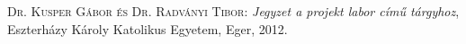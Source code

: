 \documentclass[
]{thesis-ekf}
\theoremstyle{definition}
\theoremstyle{remark}
\begin{document}
\begin{thebibliography}{2}
\textsc{Dr. Kusper Gábor és Dr. Radványi Tibor}: \emph{Jegyzet a projekt labor című tárgyhoz}, Eszterházy Károly Katolikus Egyetem, Eger, 2012.
\end{thebibliography}


\end{document}
